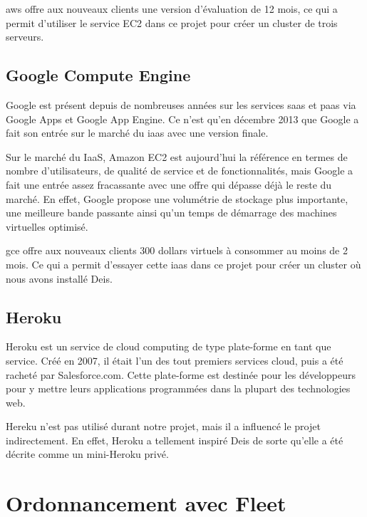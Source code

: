 \acrshort{aws} offre aux nouveaux clients une version d'évaluation de 12 mois, ce qui a permit d'utiliser le service EC2 dans ce projet pour créer un cluster de trois serveurs.

\section*{Google Compute Engine}

Google est présent depuis de nombreuses années sur les services \acrshort{saas} et \acrshort{paas} via Google Apps et Google App Engine. Ce n'est qu'en décembre 2013 que Google a fait son entrée sur le marché du \acrshort{iaas} avec une version finale.

Sur le marché du IaaS, Amazon EC2 est aujourd'hui la référence en termes de nombre d'utilisateurs, de qualité de service et de fonctionnalités, mais Google a fait une entrée assez fracassante avec une offre qui dépasse déjà le reste du marché. En effet, Google propose une volumétrie de stockage plus importante, une meilleure bande passante ainsi qu'un temps de démarrage des machines virtuelles optimisé.

\acrshort{gce} offre aux nouveaux clients 300 dollars virtuels à consommer au moins de 2 mois. Ce qui a permit d'essayer cette \acrshort{iaas} dans ce projet pour créer un cluster où nous avons installé Deis.

\section*{Heroku}

Heroku est un service de cloud computing de type plate-forme en tant que service. Créé en 2007, il était l'un des tout premiers services cloud, puis a été racheté par Salesforce.com. Cette plate-forme est destinée pour les développeurs pour y mettre leurs applications programmées dans la plupart des technologies web.

Hereku n'est pas utilisé durant notre projet, mais il a influencé le projet indirectement. En effet, Heroku a tellement inspiré Deis de sorte qu'elle a été décrite comme un mini-Heroku privé. 

\chapter{Ordonnancement avec Fleet}